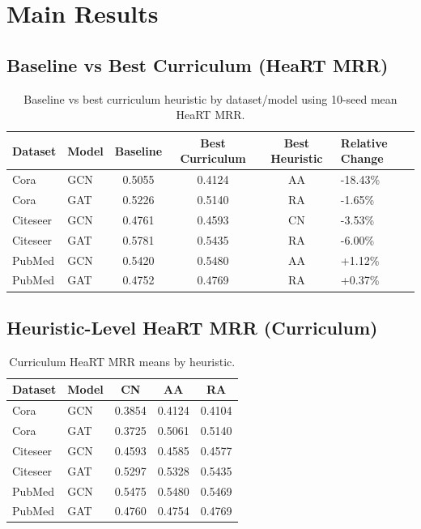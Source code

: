 \documentclass[11pt]{article}
\begin{document}
\section{Main Results}

\subsection{Baseline vs Best Curriculum (HeaRT MRR)}

\begin{table}[h]
\centering
\caption{Baseline vs best curriculum heuristic by dataset/model using 10-seed mean HeaRT MRR.}
\begin{tabular}{llcccl}
\toprule
Dataset & Model & Baseline & Best Curriculum & Best Heuristic & Relative Change \\
\midrule
Cora & GCN & 0.5055 & 0.4124 & AA & -18.43\% \\
Cora & GAT & 0.5226 & 0.5140 & RA & -1.65\% \\
Citeseer & GCN & 0.4761 & 0.4593 & CN & -3.53\% \\
Citeseer & GAT & 0.5781 & 0.5435 & RA & -6.00\% \\
PubMed & GCN & 0.5420 & 0.5480 & AA & +1.12\% \\
PubMed & GAT & 0.4752 & 0.4769 & RA & +0.37\% \\
\bottomrule
\end{tabular}
\end{table}

\subsection{Heuristic-Level HeaRT MRR (Curriculum)}

\begin{table}[h]
\centering
\caption{Curriculum HeaRT MRR means by heuristic.}
\begin{tabular}{llccc}
\toprule
Dataset & Model & CN & AA & RA \\
\midrule
Cora & GCN & 0.3854 & 0.4124 & 0.4104 \\
Cora & GAT & 0.3725 & 0.5061 & 0.5140 \\
Citeseer & GCN & 0.4593 & 0.4585 & 0.4577 \\
Citeseer & GAT & 0.5297 & 0.5328 & 0.5435 \\
PubMed & GCN & 0.5475 & 0.5480 & 0.5469 \\
PubMed & GAT & 0.4760 & 0.4754 & 0.4769 \\
\bottomrule
\end{tabular}
\end{table}
\end{document}
